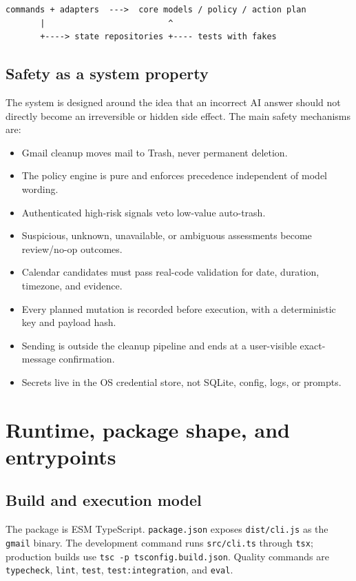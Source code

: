 \documentclass[12pt,oneside]{book}
\newcommand{\code}[1]{\nolinkurl{#1}}
\newcommand{\file}[1]{\nolinkurl{#1}}
\begin{document}
\begin{lstlisting}[language={},numbers=none]
commands + adapters  --->  core models / policy / action plan
       |                         ^
       +----> state repositories +---- tests with fakes
\end{lstlisting}

\section{Safety as a system property}

The system is designed around the idea that an incorrect AI answer should not directly become an irreversible or hidden side effect. The main safety mechanisms are:

\begin{itemize}
\item Gmail cleanup moves mail to Trash, never permanent deletion.
\item The policy engine is pure and enforces precedence independent of model wording.
\item Authenticated high-risk signals veto low-value auto-trash.
\item Suspicious, unknown, unavailable, or ambiguous assessments become review/no-op outcomes.
\item Calendar candidates must pass real-code validation for date, duration, timezone, and evidence.
\item Every planned mutation is recorded before execution, with a deterministic key and payload hash.
\item Sending is outside the cleanup pipeline and ends at a user-visible exact-message confirmation.
\item Secrets live in the OS credential store, not SQLite, config, logs, or prompts.
\end{itemize}

\chapter{Runtime, package shape, and entrypoints}

\section{Build and execution model}

The package is ESM TypeScript. \file{package.json} exposes \code{dist/cli.js} as the \code{gmail} binary. The development command runs \file{src/cli.ts} through \code{tsx}; production builds use \code{tsc -p tsconfig.build.json}. Quality commands are \code{typecheck}, \code{lint}, \code{test}, \code{test:integration}, and \code{eval}.
\end{document}
